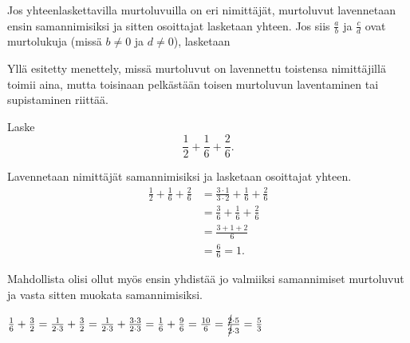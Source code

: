 
Jos yhteenlaskettavilla murtoluvuilla on eri nimittäjät, murtoluvut lavennetaan ensin samannimisiksi ja sitten osoittajat lasketaan yhteen. Jos siis $\frac{a}{b}$ ja $\frac{c}{d}$ ovat murtolukuja (missä $b \neq 0$ ja $d \neq 0$), lasketaan

 
Yllä esitetty menettely, missä murtoluvut on lavennettu toistensa nimittäjillä toimii aina, mutta toisinaan pelkästään toisen murtoluvun laventaminen tai supistaminen riittää.

\begin{esimerkki}
        Laske
        \[
        \frac{1}{2} + \frac{1}{6} + \frac{2}{6}.
        \]
        
        \begin{esimratk}
        Lavennetaan nimittäjät samannimisiksi ja lasketaan osoittajat yhteen.
        \begin{align*}
            \frac{1}{2} + \frac{1}{6} + \frac{2}{6} &=\frac{3\cdot 1}{3\cdot 2} + \frac{1}{6} + \frac{2}{6}\\
            										&=\frac{3}{6} + \frac{1}{6} + \frac{2}{6}\\
           											&= \frac{3+1+2}{6}\\
           											&= \frac{6}{6} = 1.
        \end{align*}
        
        Mahdollista olisi ollut myös ensin yhdistää jo valmiiksi samannimiset murtoluvut ja vasta sitten muokata samannimisiksi.
        \end{esimratk}
    \end{esimerkki}
    
\begin{esimerkki}

$ \frac{1}{6} + \frac{3}{2} = \frac{1}{2\cdot 3} + \frac{3}{2} = \frac{1}{2 \cdot 3} + \frac{3 \cdot 3}{2 \cdot 3} = \frac{1}{6} + \frac{9}{6} = \frac{10}{6} = \frac{\cancel{2} \cdot 5}{\cancel{2} \cdot 3} = \frac{5}{3}$

\end{esimerkki}    
    
